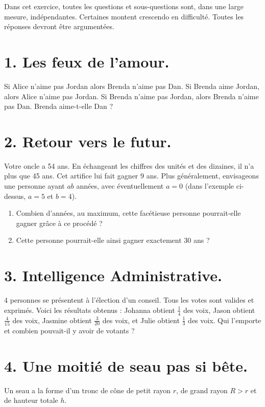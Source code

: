 Dans cet exercice, toutes les questions et sous-questions sont, dans une large mesure, indépendantes. Certaines montent crescendo en difficulté. Toutes les réponses devront être argumentées.

\medskip

\noindent
\section*{1. Les feux de l'amour.} 
Si Alice n'aime pas Jordan alors Brenda n'aime pas Dan. 
Si Brenda aime Jordan, alors Alice n'aime pas Jordan. 
Si Brenda n'aime pas Jordan, alors Brenda n'aime pas Dan. 
Brenda aime-t-elle Dan ?

\medskip

\noindent
\section*{2. Retour vers le futur.} 
Votre oncle a 54 ans. En échangeant les chiffres des unités et des dizaines, il n'a plus que 45 ans. Cet artifice lui fait gagner 9 ans. 
Plus généralement, envisageons une personne ayant \( ab \) années, avec éventuellement \( a = 0 \) (dans l'exemple ci-dessus, \( a = 5 \) et \( b = 4 \)).  
\begin{enumerate}
    \item Combien d'années, au maximum, cette facétieuse personne pourrait-elle gagner grâce à ce procédé ?  
    \item Cette personne pourrait-elle ainsi gagner exactement 30 ans ?
\end{enumerate}

\medskip

\noindent
\section*{3. Intelligence Administrative.} 
4 personnes se présentent à l'élection d'un conseil. Tous les votes sont valides et exprimés. Voici les résultats obtenus : 
Johanna obtient \( \frac{1}{4} \) des voix, Jason obtient \( \frac{4}{15} \) des voix, Jasmine obtient \( \frac{3}{20} \) des voix, et Julie obtient \( \frac{1}{3} \) des voix. 
Qui l'emporte et combien pouvait-il y avoir de votants ?

\medskip

\noindent
\section*{4. Une moitié de seau pas si bête.} 
Un seau a la forme d'un tronc de cône de petit rayon \( r \), de grand rayon \( R > r \) et de hauteur totale \( h \).  

